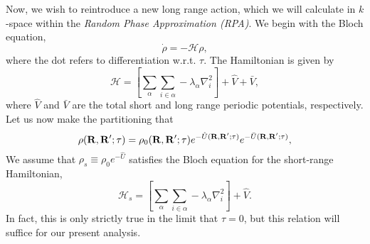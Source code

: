 \documentclass{article}
\begin{document}
Now, we wish to reintroduce a new long range action, which we will
calculate in $k$-space within the {\em Random Phase Approximation
  (RPA)}.   We begin with the Bloch equation,
\begin{equation}
\dot{\rho} = -\mathcal{H} \rho,
\end{equation}
where the dot refers to differentiation w.r.t. $\tau$.  The
Hamiltonian is given by
\begin{equation}
\mathcal{H} = \left[\sum_\alpha \sum_{i\in \alpha} -\lambda_\alpha
\nabla_i^2\right] + \hat{V} + \bar{V},
\end{equation}
where $\hat{V}$ and $\bar{V}$ are the total short and long range
periodic potentials, respectively.
Let us now make the partitioning that
\begin{equation}
\rho(\mathbf{R}, \mathbf{R}';\tau) = \rho_0(\mathbf{R}, \mathbf{R}';\tau) e^{-\hat{U}(\mathbf{R},
  \mathbf{R}';\tau)} e^{-\bar{U}(\mathbf{R}, \mathbf{R}';\tau)},
\end{equation}
We assume that $\rho_s \equiv \rho_0 e^{-\hat{U}}$ satisfies the Bloch
equation for the short-range Hamiltonian,
\begin{equation}
\mathcal{H}_s = \left[\sum_\alpha \sum_{i\in \alpha} -\lambda_\alpha
\nabla_i^2\right] + \hat{V}.
\end{equation}
In fact, this is only strictly true in the limit that $\tau=0$, but
this relation will suffice for our present analysis.
\end{document}
